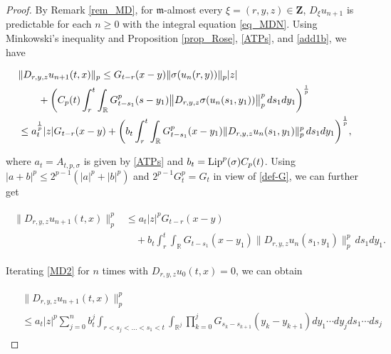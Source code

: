 \documentclass[letterpaper, 11pt,  reqno]{amsart}
\newcommand{\noi}{\noindent}
\newcommand{\R}{\mathbb{R}}
\newcommand{\s}{\sigma}
\newcommand{\Lip}{\textup{Lip}}
\newcommand{\fm}{\mathfrak{m}}
\numberwithin{equation}{section}
\numberwithin{theorem}{section}
\begin{document}
\begin{proof}
 

By Remark \ref{rem_MD}, for $\fm$-almost every $\xi =(r, y,z) \in \mathbf{Z}$,
  $D_\xi u_{n+1}$ is predictable for each $n \geq 0$
  with  the integral equation \eqref{eq_MDN}.
Using Minkowski's inequality and  Proposition  \ref{prop_Rose}, 
\eqref{ATPs}, and \eqref{add1b}, we have


\noi
\begin{align}   \notag%
\begin{aligned}
& \| D_{r, y, z} u_{n+1}(t,x)  \|_p 
 \leq  G_{t-r}(x-y)   \|\s(u_n(r,y))\|_p |z|\\
&\qquad  + \bigg(  C_{p}(t)   \int_r^t \int_{\R}  G_{t-s_1}^p(s-y_1)
     \big\|  D_{r, y, z} \s(u_n(s_1, y_1))  \big\|_p^p \, ds_1dy_1 \bigg)^{\frac1p}\\
    & \leq   a_t^{\frac1p}|z|G_{t-r}(x-y)+ \bigg( b_t  \int_r^t \int_{\R} 
    G^p_{t-s_1}(x-y_1)
    \|  D_{r, y, z} u_n(s_1, y_1) \|_p^p \, ds_1dy_1 \bigg)^{\frac1p},
\end{aligned}
\end{align} 

 

\noi
where $a_t=A_{t, p,\s}$ is given by \eqref{ATPs} and 
$b_t=\Lip^p(\s)   C_p(t)$.
Using  
$|a+b|^p \leq 2^{p-1} (|a|^p + |b|^p)$
and $2^{p-1} G_t^p = G_t$ in view of \eqref{def-G},
we can further get 

\noi
\begin{align}\label{MD2}
\begin{aligned}
 \| D_{r, y, z} u_{n+1}(t,x)  \|_p^p 
& \leq  a_{t}  |z|^p G_{t-r}(x-y)\\
&\quad +    b_t  \int_r^t \int_{\R}  G_{t-s_1}(x-y_1)
    \big\|  D_{r,y,z} u_n(s_1,y_1) \big\|_p^p  \,  ds_1dy_1.
\end{aligned}
\end{align}

 
\noi
Iterating \eqref{MD2} for  $n$ times
with
$D_{r,y, z} u_0(t,x)  = 0$,
 we  can obtain 


\noi
\begin{align}\label{MD3}
\begin{aligned}
& \| D_{r, y, z} u_{n+1}(t,x)  \|_p^p   \\
&   \leq  a_{t}  |z|^p   
\sum_{j=0}^{n} b_t^j
\int_{r< s_j <  \ldots < s_1 < t } 
\int_{\R^j}  \prod_{k=0}^{j} G_{s_k-s_{k+1}}(y_k-y_{k+1})   dy_1\cdots dy_j ds_1 \cdots ds_j 
\end{aligned}
\end{align}


\end{proof}
\end{document}
